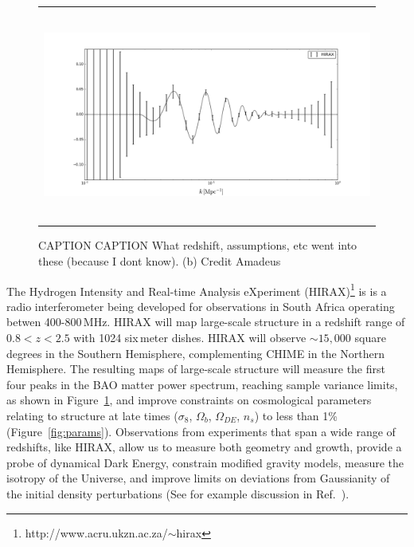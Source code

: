 \documentclass[]{spie}  %
\begin{document}
 \begin{figure} [t]
   \begin{center}
   \begin{tabular}{c} %
  \includegraphics[height=7cm]{fbao_constraints_hirax.png}
   \end{tabular}
   \end{center}
   \caption[dish] 
   { \label{fig:pspec} 
CAPTION CAPTION What redshift, assumptions, etc went into these (because I dont know). (b) Credit Amadeus}
   \end{figure} 
   
   
The Hydrogen Intensity and Real-time Analysis eXperiment (HIRAX)\footnote{http:\//\//www.acru.ukzn.ac.za\//$\sim$hirax} is is a radio interferometer being developed for observations in South Africa operating betwen 400-800\,MHz. HIRAX will map large-scale structure in a redshift range of $0.8 < z < 2.5$ with 1024 six\,meter dishes. HIRAX will observe $\sim15,000$ square degrees in the Southern Hemisphere, complementing CHIME \cite{2014SPIE.9145E..22B} in the Northern Hemisphere. The resulting maps of large-scale structure will measure the first four peaks in the BAO matter power spectrum, reaching sample variance limits, as shown in Figure~\ref{fig:pspec}, and improve constraints on cosmological parameters relating to structure at late times ($\sigma_{8}$, $\Omega_{b}$, $\Omega_{DE}$, $n_{s}$) to less than 1\% (Figure~\ref{fig:params}). Observations from experiments that span a wide range of redshifts, like HIRAX, allow us to measure both geometry and growth, provide a probe of dynamical Dark Energy, constrain modified gravity models, measure the isotropy of the Universe, and improve limits on deviations from Gaussianity of the initial density perturbations (See for example discussion in Ref.~\cite{2015aska.confE..19S}). \newline
\end{document}
